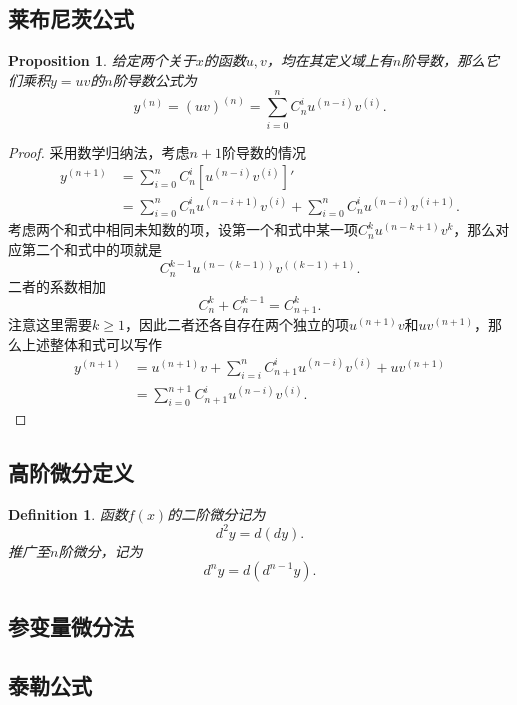 \documentclass{article}
\newtheorem{proposition}[theorem]{Proposition}
\newtheorem{definition}[theorem]{Definition}
\begin{document}
\newpage
\subsection{莱布尼茨公式}

\begin{proposition}
\rm 给定两个关于$x$的函数$u,v$，均在其定义域上有$n$阶导数，那么它们乘积$y=uv$的$n$阶导数公式为
$$
y^{(n)} =(uv)^{(n)} = \sum\limits_{i=0}^n C^i_n u^{(n-i)}v^{(i)}.
$$
\end{proposition}

\begin{proof}
采用数学归纳法，考虑$n+1$阶导数的情况
$$
\begin{array}{ll}
y^{(n+1)} &= \sum\limits_{i=0}^n C^i_n \left[u^{(n-i)}v^{(i)}\right]' \\
	&= \sum\limits_{i=0}^n C^i_n u^{(n-i+1)}v^{(i)} + \sum\limits_{i=0}^n C^i_n u^{(n-i)}v^{(i+1)}.
\end{array} 
$$
考虑两个和式中相同未知数的项，设第一个和式中某一项$C^k_n u^{(n-k+1)}v^{k}$，那么对应第二个和式中的项就是
$$
C^{k-1}_n u^{(n-(k-1))}v^{((k-1)+1)}.
$$
二者的系数相加
$$
C^k_n + C^{k-1}_n = C^k_{n+1}.
$$
注意这里需要$k\geq 1$，因此二者还各自存在两个独立的项$u^{(n+1)}v$和$uv^{(n+1)}$，那么上述整体和式可以写作
$$
\begin{array}{ll}
y^{(n+1)} &= u^{(n+1)}v + \sum\limits_{i=i}^{n} C^i_{n+1} u^{(n-i)}v^{(i)} + uv^{(n+1)} \\
& = \sum\limits_{i=0}^{n+1} C^i_{n+1} u^{(n-i)}v^{(i)}.
\end{array}
$$
\end{proof}

\subsection{高阶微分定义}

\begin{definition}
\rm 函数$f(x)$的二阶微分记为
$$
d^2y = d(dy).
$$
推广至$n$阶微分，记为
$$
d^ny = d(d^{n-1}y).
$$
\end{definition}

\subsection{参变量微分法}

\newpage
\subsection{泰勒公式}
\end{document}
